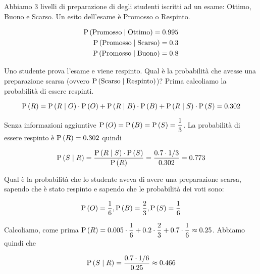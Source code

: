 \begin{exrc}
	Abbiamo 3 livelli di preparazione di degli studenti iscritti ad un esame: Ottimo, Buono e Scarso.
	Un esito dell'esame \`e Promosso o Respinto.
	
	\begin{equation*}
		\begin{aligned}
		\text{P}\left(\text{Promosso}  \mid  \text{Ottimo}\right) = 0.995\\
		\text{P}\left(\text{Promosso}  \mid  \text{Scarso}\right) = 0.3\\
		\text{P}\left(\text{Promosso}  \mid  \text{Buono}\right) = 0.8\\
		\end{aligned}
	\end{equation*}
	
	Uno studente prova l'esame e viene respinto. Qual \`e la probabilit\`a che avesse una preparazione scarsa (ovvero $ \text{P}\left(\text{Scarso} \mid \text{Respinto}\right) $)? Prima calcoliamo la probabilit\`a di essere respinti.
	
	\begin{equation*}
	\text{P}\left(R\right) = \text{P}\left(R \mid O\right) \cdot \text{P}\left(O\right) + \text{P}\left(R  \mid  B\right) \cdot \text{P}\left(B\right) + \text{P}\left(R \mid S\right) \cdot \text{P}\left(S\right) = 0.302
	\end{equation*}
	
	Senza informazioni aggiuntive $ \text{P}\left(O\right) = \text{P}\left(B\right) = \text{P}\left(S\right) = \dfrac{1}{3} $. 
	La probabilit\`a di essere respinto \`e $ \text{P}\left(R\right) = 0.302 $ quindi 
	
	\begin{equation*}
	\text{P}\left(S  \mid  R\right) = \dfrac{\text{P}\left(R \mid S\right)\cdot \text{P}\left(S\right)}{\text{P}\left(R\right)} = \dfrac{0.7 \cdot 1/3}{0.302} = 0.773
	\end{equation*}
\end{exrc}

\begin{exrc}
	Qual \`e la probabilit\`a che lo studente aveva di avere una preparazione scarsa, sapendo che \`e stato respinto e sapendo che le probabilit\`a dei voti sono:

	\begin{equation*}
		 \text{P}\left(O\right) = \dfrac{1}{6}, \text{P}\left(B\right) = \dfrac{2}{3}, \text{P}\left(S\right) = \dfrac{1}{6}
	\end{equation*}
	
	Calcoliamo, come prima $ \text{P}\left(R\right) = 0.005 \cdot \dfrac{1}{6} + 0.2 \cdot \dfrac{2}{3} + 0.7 \cdot \dfrac{1}{6} \approx 0.25 $. Abbiamo quindi che 
	
	\begin{equation*}
		\text{P}\left(S \mid R\right) = \dfrac{0.7 \cdot 1/6}{0.25} \approx 0.466
	\end{equation*}
\end{exrc}

